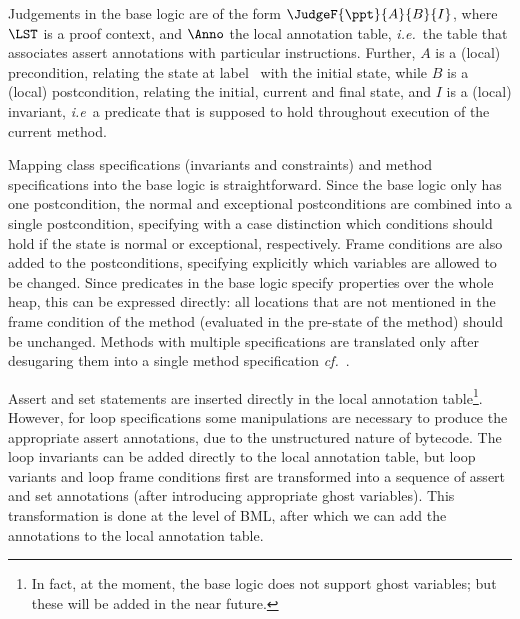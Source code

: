 Judgements in the \mobius base logic are of the form
\(\JudgeF{\ppt}{A}{B}{I}\), where \(\LST\) is a proof context,
and \(\Anno\) the local annotation table, \emph{i.e.}~the table that
associates assert annotations with particular instructions. Further,
\(A\) is a (local) precondition, relating the state at label \ppt\
with the initial state, while \(B\) is a (local) postcondition,
relating the initial, current and final state, and \(I\) is a (local)
invariant, \emph{i.e}\ a predicate that is supposed to hold throughout
execution of the current method.

Mapping class specifications (invariants and constraints) and
method specifications into the \mobius base logic is straightforward.
Since the \mobius base logic only has one postcondition, the normal
and exceptional postconditions are combined into a single
postcondition, specifying with a case distinction which conditions
should hold if the state is normal or exceptional, respectively. Frame
conditions are also added to the postconditions, specifying
explicitly which variables are allowed to be changed. Since predicates
in the \mobius base logic specify properties over the whole heap, this
can be expressed directly: all locations that are not mentioned in the
frame condition of the method (evaluated in the pre-state of the
method) should be unchanged. Methods with multiple specifications are
translated only after desugaring them into a single method
specification \emph{cf.}~\cite{RaghavanL00}. 

Assert and set statements are inserted directly in the local
annotation table\footnote{In fact, at the moment, the \mobius base
logic does not support ghost variables; but these will be added in the
near future.}. However, for loop specifications some manipulations
are necessary to produce the appropriate assert annotations, due to
the unstructured nature of bytecode. The loop invariants can be added
directly to the local annotation table, but loop variants and loop
frame conditions first are transformed into a sequence of assert and
set annotations (after introducing appropriate ghost variables). This
transformation is done at the level of BML, after which we can add
the annotations to the local annotation table.

